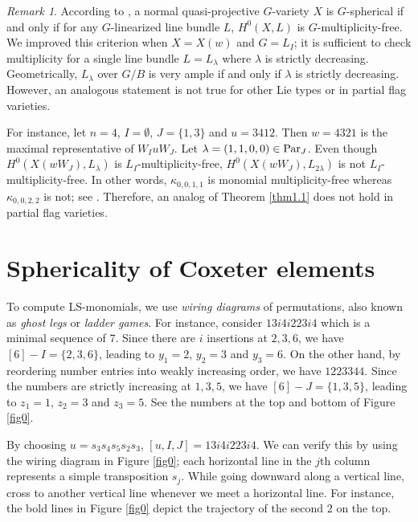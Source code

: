 \documentclass[12pt]{amsart}
\theoremstyle{definition}
\theoremstyle{remark}
\newtheorem{remark}{Remark}
\newcommand{\Parj}{{\rm Par}_J}
\begin{document}
\begin{remark}\label{rmk3.1}
According to \cite[Theorem~2.1.2]{MR3177371}, a normal quasi-projective $G$-variety $X$ is $G$-spherical if and only if for any $G$-linearized line bundle $L$, $H^0 (X , L)$ is $G$-multiplicity-free. We improved this criterion when $X = X(w)$ and $G = L_I$; it is sufficient to check multiplicity for a single line bundle $L = L_\lambda$ where $\lambda$ is strictly decreasing. Geometrically, $L_\lambda$ over $G/B$ is very ample if and only if $\lambda$ is strictly decreasing. However, an analogous statement is not true for other Lie types or in partial flag varieties.

For instance, let $n=4$, $I = \emptyset$, $J = \{1,3\}$ and $u = 3412$. Then $w = 4321$ is the maximal representative of $W_I u W_J$. Let $\lambda = (1,1,0,0) \in \Parj$. Even though $H^0 (X(wW_J),L_\lambda)$ is $L_I$-multiplicity-free, $H^0 (X(wW_J),L_{2\lambda})$ is not $L_I$-multiplicity-free. In other words, $\kappa_{0,0,1,1}$ is monomial multiplicity-free whereas $\kappa_{0,0,2,2}$ is not; see \cite[Theorem 1.1]{MR4599567}. Therefore, an analog of Theorem \ref{thm1.1} does not hold in partial flag varieties.
\end{remark}



\section{Sphericality of Coxeter elements}\label{sec5}

To compute LS-monomials, we use \textit{wiring diagrams} of permutations, also known as \textit{ghost legs} or \textit{ladder games}. For instance, consider $13i4i223i4$ which is a minimal sequence of $7$. Since there are $i$ insertions at $2,3,6$, we have $[6] - I = \{2,3,6\}$, leading to $y_1 = 2$, $y_2 = 3$ and $y_3 = 6$. On the other hand, by reordering number entries into weakly increasing order, we have $1223344$. Since the numbers are strictly increasing at $1,3,5$, we have $[6]-J = \{1,3,5\}$, leading to $z_1 = 1$, $z_2 = 3$ and $z_3 = 5$. See the numbers at the top and bottom of Figure \ref{fig0}.

By choosing $u = s_3 s_4 s_5 s_2 s_3$, $[u,I,J] = 13i4i223i4$. We can verify this by using the wiring diagram in Figure \ref{fig0}; each horizontal line in the $j$th column represents a simple transposition $s_j$. While going downward along a vertical line, cross to another vertical line whenever we meet a horizontal line. For instance, the bold lines in Figure \ref{fig0} depict the trajectory of the second $2$ on the top.
\end{document}

